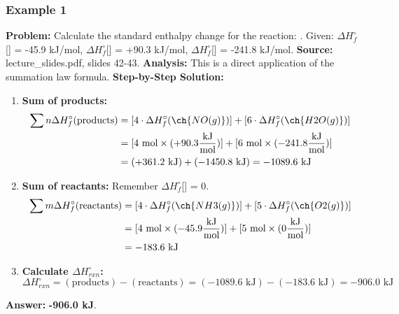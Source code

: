 \documentclass{article}
\begin{document}
\subsubsection{Example 1}
\textbf{Problem:} Calculate the standard enthalpy change for the reaction: .
Given: $\Delta H_f^\circ$[] = -45.9 kJ/mol, $\Delta H_f^\circ$[] = +90.3 kJ/mol, $\Delta H_f^\circ$[] = -241.8 kJ/mol.
\textbf{Source:} lecture\_slides.pdf, slides 42-43.
\textbf{Analysis:} This is a direct application of the summation law formula.
\textbf{Step-by-Step Solution:}
\begin{enumerate}
    \item \textbf{Sum of products:}
    \begin{align*}
    \sum n\Delta H_f^\circ(\text{products}) &= [4 \cdot \Delta H_f^\circ(\ch{NO(g)})] + [6 \cdot \Delta H_f^\circ(\ch{H2O(g)})] \\
    &= [4 \text{ mol} \times (+90.3 \frac{\text{kJ}}{\text{mol}})] + [6 \text{ mol} \times (-241.8 \frac{\text{kJ}}{\text{mol}})] \\
    &= (+361.2 \text{ kJ}) + (-1450.8 \text{ kJ}) = -1089.6 \text{ kJ}
    \end{align*}
    \item \textbf{Sum of reactants:} Remember $\Delta H_f^\circ$[] = 0.
    \begin{align*}
    \sum m\Delta H_f^\circ(\text{reactants}) &= [4 \cdot \Delta H_f^\circ(\ch{NH3(g)})] + [5 \cdot \Delta H_f^\circ(\ch{O2(g)})] \\
    &= [4 \text{ mol} \times (-45.9 \frac{\text{kJ}}{\text{mol}})] + [5 \text{ mol} \times (0 \frac{\text{kJ}}{\text{mol}})] \\
    &= -183.6 \text{ kJ}
    \end{align*}
    \item \textbf{Calculate $\Delta H_{rxn}^\circ$:}
    \[ \Delta H_{rxn}^\circ = (\text{products}) - (\text{reactants}) = (-1089.6 \text{ kJ}) - (-183.6 \text{ kJ}) = -906.0 \text{ kJ} \]
\end{enumerate}
\textbf{Answer:} \textbf{-906.0 kJ}.
\end{document}
